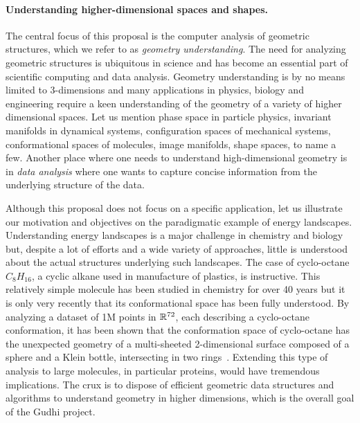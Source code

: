 \paragraph{Understanding higher-dimensional spaces and shapes.} 
The central focus of this proposal is  the computer %
analysis of geometric structures, which we refer to as {\em geometry understanding}.  The need for analyzing geometric structures is ubiquitous in science and has become an essential part of scientific computing and data analysis. Geometry understanding is by no means limited to 3-dimensions and many applications in physics, biology and engineering require a keen understanding of the geometry of a variety of higher dimensional spaces. Let us mention phase space in particle physics, invariant manifolds in dynamical systems, configuration spaces of mechanical systems, conformational spaces of molecules, image manifolds, shape spaces, to name a few. Another place where one needs to understand
high-dimensional geometry is in {\em data analysis} where one wants to
capture concise information from the underlying structure of the data. 

Although this proposal does not focus on a specific application,  let us illustrate our motivation and objectives on the paradigmatic example of energy landscapes. Understanding  energy landscapes is a major challenge in chemistry and biology but,  despite a lot of efforts and a wide variety of approaches, little is understood about the actual structures underlying such landscapes. The case of cyclo-octane $C_8H_{16}$, a cyclic alkane used in manufacture of plastics, is instructive. This relatively simple molecule has been studied in chemistry for over 40 years but it is only very recently that its conformational space has been fully understood. By analyzing a dataset of 1M points in $\mathbb R^{72}$, each describing a cyclo-octane conformation, it has been shown that the conformation space of cyclo-octane has the unexpected geometry of  a multi-sheeted 2-dimensional surface composed of a sphere and a Klein bottle, intersecting in two rings~\cite{mtcw-tco-2010}.  Extending this type of analysis to large molecules, in particular proteins, would have tremendous implications. The crux is to dispose of efficient geometric data structures and algorithms to understand geometry in higher dimensions, which is the overall goal of the Gudhi project.


